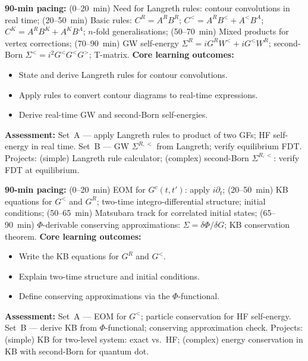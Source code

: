 \documentclass[11pt,a4paper]{article}
\begin{document}
\medskip

\begin{tcolorbox}[modulebox, title={Module~II.5 / L04: Langreth Rules}]
\textbf{90-min pacing:} (0--20~min) Need for Langreth rules: contour convolutions in real time; (20--50~min) Basic rules: $C^R=A^R B^R$; $C^<=A^R B^<+A^< B^A$; $C^K=A^R B^K+A^K B^A$; $n$-fold generalisations; (50--70~min) Mixed products for vertex corrections; (70--90~min) GW self-energy $\Sigma^R=iG^RW^<+iG^<W^R$; second-Born $\Sigma^<=i^2G^<G^<G^>$; T-matrix.
\medskip\textbf{Core learning outcomes:}
\begin{itemize}[leftmargin=1.4em,topsep=2pt,itemsep=1pt]
  \item State and derive Langreth rules for contour convolutions.
  \item Apply rules to convert contour diagrams to real-time expressions.
  \item Derive real-time GW and second-Born self-energies.
\end{itemize}
\medskip\textbf{Assessment:}
Set~A --- apply Langreth rules to product of two GFs; HF self-energy in real time.
Set~B --- GW $\Sigma^{R,<}$ from Langreth; verify equilibrium FDT.
Projects: (simple) Langreth rule calculator; (complex) second-Born $\Sigma^{R,<}$: verify FDT at equilibrium.
\end{tcolorbox}

\medskip

\begin{tcolorbox}[modulebox, title={Module~II.5 / L05: Kadanoff--Baym Equations}]
\textbf{90-min pacing:} (0--20~min) EOM for $G^c(t,t')$: apply $i\partial_t$; (20--50~min) KB equations for $G^<$ and $G^R$; two-time integro-differential structure; initial conditions; (50--65~min) Matsubara track for correlated initial states; (65--90~min) $\Phi$-derivable conserving approximations: $\Sigma=\delta\Phi/\delta G$; KB conservation theorem.
\medskip\textbf{Core learning outcomes:}
\begin{itemize}[leftmargin=1.4em,topsep=2pt,itemsep=1pt]
  \item Write the KB equations for $G^R$ and $G^<$.
  \item Explain two-time structure and initial conditions.
  \item Define conserving approximations via the $\Phi$-functional.
\end{itemize}
\medskip\textbf{Assessment:}
Set~A --- EOM for $G^<$; particle conservation for HF self-energy.
Set~B --- derive KB from $\Phi$-functional; conserving approximation check.
Projects: (simple) KB for two-level system: exact vs.\ HF; (complex) energy conservation in KB with second-Born for quantum dot.
\end{tcolorbox}
\end{document}
